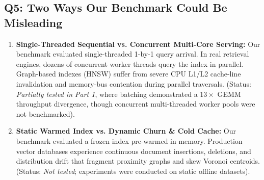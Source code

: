 \documentclass[11pt,a4paper]{article}
\begin{document}
\subsection{Q5: Two Ways Our Benchmark Could Be Misleading}
\begin{enumerate}
    \item \textbf{Single-Threaded Sequential vs. Concurrent Multi-Core Serving:} Our benchmark evaluated single-threaded 1-by-1 query arrival. In real retrieval engines, dozens of concurrent worker threads query the index in parallel. Graph-based indexes (HNSW) suffer from severe CPU L1/L2 cache-line invalidation and memory-bus contention during parallel traversals. (Status: \textit{Partially tested in Part 1}, where batching demonstrated a $13\times$ GEMM throughput divergence, though concurrent multi-threaded worker pools were not benchmarked).
    \item \textbf{Static Warmed Index vs. Dynamic Churn \& Cold Cache:} Our benchmark evaluated a frozen index pre-warmed in memory. Production vector databases experience continuous document insertions, deletions, and distribution drift that fragment proximity graphs and skew Voronoi centroids. (Status: \textit{Not tested}; experiments were conducted on static offline datasets).
\end{enumerate}
\end{document}
